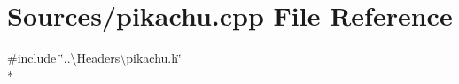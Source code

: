 \section{Sources/pikachu.cpp File Reference}
\label{pikachu_8cpp}
{\ttfamily \#include \char`\"{}..\textbackslash{}\+Headers\textbackslash{}pikachu.\+h\char`\"{}}\\*
